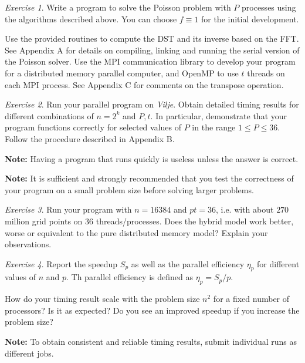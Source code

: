 \documentclass[onecolumn, oneside, a4paper, 11pt]{memoir}
\theoremstyle{remark}
\newtheorem{ex}{Exercise}
\begin{document}
\begin{ex}
  Write a program to solve the Poisson problem with $P$ processes using the
  algorithms described above. You can choose $f \equiv 1$ for the initial
  development.

  Use the provided routines to compute the DST and its inverse based on the FFT.
  See Appendix A for details on compiling, linking and running the serial
  version of the Poisson solver. Use the MPI communication library to develop
  your program for a distributed memory parallel computer, and OpenMP to use $t$
  threads on each MPI process. See Appendix C for comments on the transpose
  operation.
\end{ex}

\begin{ex}
  Run your parallel program on \emph{Vilje}. Obtain detailed timing results for
  different combinations of $n=2^k$ and $P, t$. In particular, demonstrate that
  your program functions correctly for selected values of $P$ in the range
  $1 \leq P \leq 36$. Follow the procedure described in Appendix B.

  \textbf{Note:} Having a program that runs quickly is useless unless the answer
  is correct.

  \textbf{Note:} It is sufficient and strongly recommended that you test the
  correctness of your program on a small problem size before solving larger
  problems.
\end{ex}

\begin{ex}
  Run your program with $n=16384$ and $pt=36$, i.e. with about $270$ million
  grid points on 36 threads/processes. Does the hybrid model work better, worse
  or equivalent to the pure distributed memory model? Explain your observations.
\end{ex}

\begin{ex}
  Report the speedup $S_p$ as well as the parallel efficiency $\eta_p$ for
  different values of $n$ and $p$. Th parallel efficiency is defined as
  $\eta_p = S_p / p$.

  How do your timing result scale with the problem size $n^2$ for a fixed number
  of processors? Is it as expected? Do you see an improved speedup if you
  increase the problem size?

  \textbf{Note:} To obtain consistent and reliable timing results, submit
  individual runs as different jobs.
\end{ex}
\end{document}

